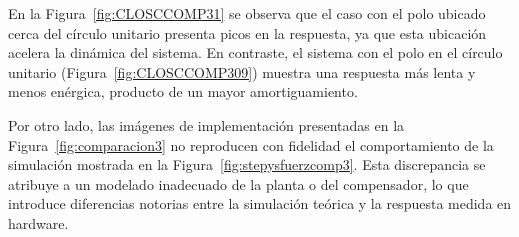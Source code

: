 \begin{enumerate}[label=4.\arabic*.]
\begin{enumerate}[label*=4.\arabic*.]
			
			
			
			En la Figura~\ref{fig:CLOSCCOMP31} se observa que el caso con el polo ubicado cerca del círculo unitario presenta picos en la respuesta, ya que esta ubicación acelera la dinámica del sistema. En contraste, el sistema con el polo en el círculo unitario (Figura~\ref{fig:CLOSCCOMP309}) muestra una respuesta más lenta y menos enérgica, producto de un mayor amortiguamiento.\
			
			Por otro lado, las imágenes de implementación presentadas en la Figura~\ref{fig:comparacion3} no reproducen con fidelidad el comportamiento de la simulación mostrada en la Figura~\ref{fig:stepysfuerzcomp3}. Esta discrepancia se atribuye a un modelado inadecuado de la planta o del compensador, lo que introduce diferencias notorias entre la simulación teórica y la respuesta medida en hardware.

			
			
		\end{enumerate}
\end{enumerate}
